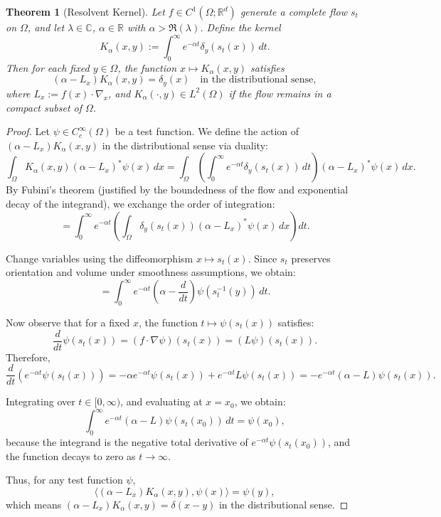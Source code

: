 \documentclass[11pt]{article}
\theoremstyle{plain}
\newtheorem{theorem}{Theorem}[section]
\def\[{\begin{equation}}
\def\]{\end{equation}}
\begin{document}
\begin{theorem}[Resolvent Kernel]
\label{lem:resolvent}
Let \( f \in C^1(\Omega; \mathbb{R}^d) \) generate a complete flow \( s_t \) on \( \Omega \), and let \( \lambda \in \mathbb{C} \), \( \alpha \in \mathbb{R} \) with \( \alpha > \Re(\lambda) \). Define the kernel
\[
K_\alpha(x, y) := \int_0^\infty e^{-\alpha t} \delta_y(s_t(x)) \, dt.
\]
Then for each fixed \( y \in \Omega \), the function \( x \mapsto K_\alpha(x, y) \) satisfies
\[
(\alpha - L_x) K_\alpha(x, y) = \delta_y(x)
\quad \text{in the distributional sense},
\]
where \( L_x := f(x) \cdot \nabla_x \), and \( K_\alpha(\cdot, y) \in L^2(\Omega) \) if the flow remains in a compact subset of \( \Omega \).
\end{theorem}

\begin{proof}
Let \( \psi \in C_c^\infty(\Omega) \) be a test function. We define the action of \( (\alpha - L_x) K_\alpha(x, y) \) in the distributional sense via duality:
\[
\int_\Omega K_\alpha(x, y) (\alpha - L_x)^* \psi(x) \, dx = \int_\Omega \left( \int_0^\infty e^{-\alpha t} \delta_y(s_t(x)) \, dt \right) (\alpha - L_x)^* \psi(x) \, dx.
\]
By Fubini's theorem (justified by the boundedness of the flow and exponential decay of the integrand), we exchange the order of integration:
\[
= \int_0^\infty e^{-\alpha t} \left( \int_\Omega \delta_y(s_t(x)) (\alpha - L_x)^* \psi(x) \, dx \right) dt.
\]

Change variables using the diffeomorphism \( x \mapsto s_t(x) \). Since \( s_t \) preserves orientation and volume under smoothness assumptions, we obtain:
\[
= \int_0^\infty e^{-\alpha t} (\alpha - \frac{d}{dt}) \psi(s_t^{-1}(y)) \, dt.
\]

Now observe that for a fixed \( x \), the function \( t \mapsto \psi(s_t(x)) \) satisfies:
\[
\frac{d}{dt} \psi(s_t(x)) = (f \cdot \nabla \psi)(s_t(x)) = (L \psi)(s_t(x)).
\]
Therefore,
\[
\frac{d}{dt} \left( e^{-\alpha t} \psi(s_t(x)) \right) = -\alpha e^{-\alpha t} \psi(s_t(x)) + e^{-\alpha t} L \psi(s_t(x)) = -e^{-\alpha t} (\alpha - L) \psi(s_t(x)).
\]

Integrating over \( t \in [0, \infty) \), and evaluating at \( x = x_0 \), we obtain:
\[
\int_0^\infty e^{-\alpha t} (\alpha - L) \psi(s_t(x_0)) \, dt = \psi(x_0),
\]
because the integrand is the negative total derivative of \( e^{-\alpha t} \psi(s_t(x_0)) \), and the function decays to zero as \( t \to \infty \).

Thus, for any test function \( \psi \),
\[
\langle (\alpha - L_x) K_\alpha(x, y), \psi(x) \rangle = \psi(y),
\]
which means \( (\alpha - L_x) K_\alpha(x, y) = \delta(x - y) \) in the distributional sense.


\end{proof}
\end{document}
